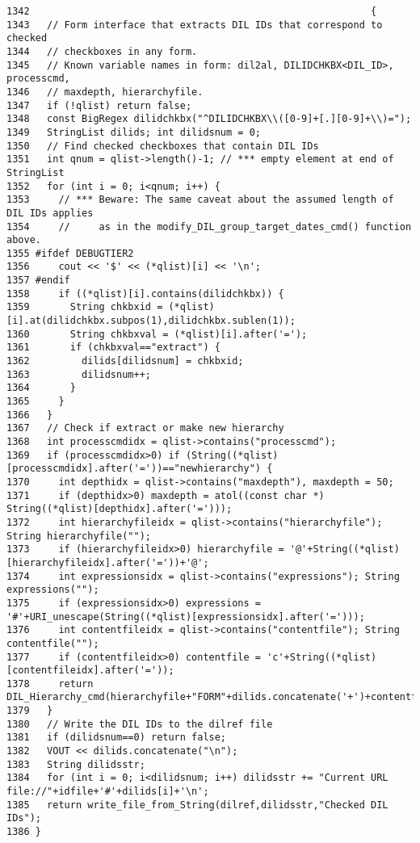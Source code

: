\footnotesize\begin{verbatim}1342                                                           {
1343   // Form interface that extracts DIL IDs that correspond to checked
1344   // checkboxes in any form.
1345   // Known variable names in form: dil2al, DILIDCHKBX<DIL_ID>, processcmd,
1346   // maxdepth, hierarchyfile.
1347   if (!qlist) return false;
1348   const BigRegex dilidchkbx("^DILIDCHKBX\\([0-9]+[.][0-9]+\\)=");
1349   StringList dilids; int dilidsnum = 0;
1350   // Find checked checkboxes that contain DIL IDs
1351   int qnum = qlist->length()-1; // *** empty element at end of StringList
1352   for (int i = 0; i<qnum; i++) {
1353     // *** Beware: The same caveat about the assumed length of DIL IDs applies
1354     //     as in the modify_DIL_group_target_dates_cmd() function above.
1355 #ifdef DEBUGTIER2
1356     cout << '$' << (*qlist)[i] << '\n';
1357 #endif
1358     if ((*qlist)[i].contains(dilidchkbx)) {
1359       String chkbxid = (*qlist)[i].at(dilidchkbx.subpos(1),dilidchkbx.sublen(1));
1360       String chkbxval = (*qlist)[i].after('=');
1361       if (chkbxval=="extract") {
1362         dilids[dilidsnum] = chkbxid;
1363         dilidsnum++;
1364       }
1365     }
1366   }
1367   // Check if extract or make new hierarchy
1368   int processcmdidx = qlist->contains("processcmd");
1369   if (processcmdidx>0) if (String((*qlist)[processcmdidx].after('='))=="newhierarchy") {
1370     int depthidx = qlist->contains("maxdepth"), maxdepth = 50;
1371     if (depthidx>0) maxdepth = atol((const char *) String((*qlist)[depthidx].after('=')));
1372     int hierarchyfileidx = qlist->contains("hierarchyfile"); String hierarchyfile("");
1373     if (hierarchyfileidx>0) hierarchyfile = '@'+String((*qlist)[hierarchyfileidx].after('='))+'@';
1374     int expressionsidx = qlist->contains("expressions"); String expressions("");
1375     if (expressionsidx>0) expressions = '#'+URI_unescape(String((*qlist)[expressionsidx].after('=')));
1376     int contentfileidx = qlist->contains("contentfile"); String contentfile("");
1377     if (contentfileidx>0) contentfile = 'c'+String((*qlist)[contentfileidx].after('='));
1378     return DIL_Hierarchy_cmd(hierarchyfile+"FORM"+dilids.concatenate('+')+contentfile+expressions,maxdepth);
1379   }
1380   // Write the DIL IDs to the dilref file
1381   if (dilidsnum==0) return false;
1382   VOUT << dilids.concatenate("\n");
1383   String dilidsstr;
1384   for (int i = 0; i<dilidsnum; i++) dilidsstr += "Current URL      file://"+idfile+'#'+dilids[i]+'\n';
1385   return write_file_from_String(dilref,dilidsstr,"Checked DIL IDs");
1386 }
\end{verbatim}\normalsize 
{}
